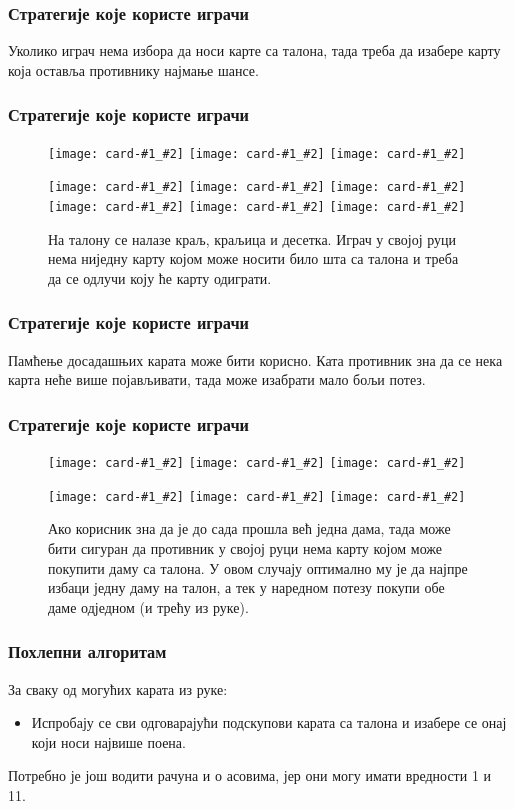 \documentclass{beamer}
\newcommand{\card}[2]{\texttt{[image: card-\#1\_\#2]}}
\begin{document}
\begin{frame}
\frametitle{Стратегије које користе играчи}
Уколико играч нема избора да носи карте са талона, тада треба да изабере карту која оставља противнику најмање шансе.
\end{frame}

\begin{frame}
\frametitle{Стратегије које користе играчи}
\begin{figure}[htbp]
	\centering
	\card{king}{club}
	\card{queen}{heart}
	\card{10}{diamond}
	
	\card{7}{diamond}
	\card{1}{spade}
	\card{9}{heart}
	\card{jack}{spade}
	\card{2}{club}
	\card{3}{diamond}
	
	\caption{На талону се налазе краљ, краљица и десетка. Играч у својој руци нема ниједну карту којом може носити било шта са талона и треба да се одлучи коју ће карту одиграти.}
\end{figure}
\end{frame}

\begin{frame}
\frametitle{Стратегије које користе играчи}
Памћење досадашњих карата може бити корисно. Ката противник зна да се нека карта неће више појављивати, тада може изабрати мало бољи потез.
\end{frame}

\begin{frame}
\frametitle{Стратегије које користе играчи}
\begin{figure}[htbp]
	\centering
	\card{queen}{heart}
	\card{7}{diamond}
	\card{2}{spade}
	
	\card{queen}{club}
	\card{9}{spade}
	\card{queen}{diamond}
	\caption{Ако корисник зна да је до сада прошла већ једна дама, тада може бити сигуран да противник у својој руци нема карту којом може покупити даму са талона. У овом случају оптимално му је да најпре избаци једну даму на талон, а тек у наредном потезу покупи обе даме одједном (и трећу из руке).}
\end{figure}
\end{frame}

\begin{frame}[allowframebreaks] 
\frametitle{Похлепни алгоритам}
За сваку од могућих карата из руке:
\begin{itemize}
	\item {Испробају се сви одговарајући подскупови карата са талона и изабере се онај који носи највише поена.}
\end{itemize}

Потребно је још водити рачуна и о асовима, јер они могу имати вредности 1 и 11.
\end{frame}
\end{document}
